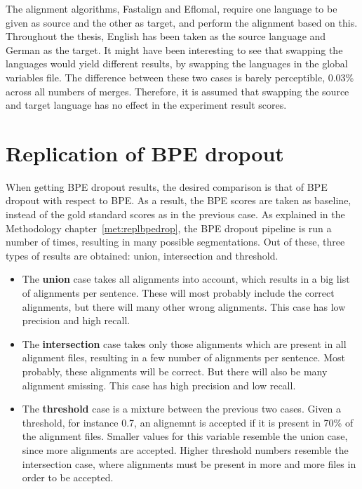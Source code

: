 The alignment algorithms, Fastalign and Eflomal, require one language to be given as source and the other as target, and perform the alignment based on this. Throughout the thesis, English has been taken as the source language and German as the target. It might have been interesting to see that swapping the languages would yield different results, by swapping the languages in the global variables file. The difference between these two cases is barely perceptible, 0.03\% across all numbers of merges. Therefore, it is assumed that swapping the source and target language has no effect in the experiment result scores.

\section{Replication of BPE dropout}

When getting BPE dropout results, the desired comparison is that of BPE dropout with respect to BPE. As a result, the BPE scores are taken as baseline, instead of the gold standard scores as in the previous case. As explained in the Methodology chapter~\ref{met:replbpedrop}, the BPE dropout pipeline is run a number of times, resulting in many possible segmentations. Out of these, three types of results are obtained: union, intersection and threshold.

\begin{itemize}
	\item The \textbf{union} case takes all alignments into account, which results in a big list of alignments per sentence. These will most probably include the correct alignments, but there will many other wrong alignments. This case has low precision and high recall.
	\item The \textbf{intersection} case takes only those alignments which are present in all alignment files, resulting in a few number of alignments per sentence. Most probably, these alignments will be correct. But there will also be many alignment smissing. This case has high precision and low recall.
	\item The \textbf{threshold} case is a mixture between the previous two cases. Given a threshold, for instance 0.7, an alignemnt is accepted if it is present in 70\% of the alignment files. Smaller values for this variable resemble the union case, since more alignments are accepted. Higher threshold numbers resemble the intersection case, where alignments must be present in more and more files in order to be accepted.
\end{itemize}

